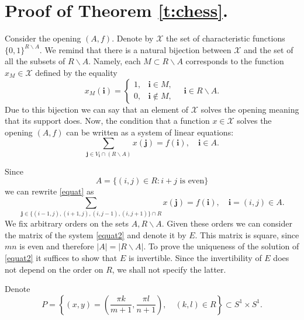 \documentclass[english,12pt]{article}
\theoremstyle{remark}
\theoremstyle{definition}
\theoremstyle{definition}
\newcommand{\bsi}{{\boldsymbol i}}
\newcommand{\bsj}{{\boldsymbol j}}
\begin{document}
\section{Proof of Theorem \ref{t:chess}.}


Consider the opening $(A,f)$. Denote by $\mathcal X$ the set of characteristic functions
$\{0,1\}^{R \backslash A}$. We remind that there is a natural bijection between $\mathcal X$ and
the set of all the subsets of $R\backslash A$. Namely, each $M\subset R\backslash A$ corresponds to
the function $x_M \in \mathcal X$ defined by the equality
\begin{equation}
x_M(\bsi)= \left \{
\begin{array}{cc}
1, & \bsi \in M, \\
0, & \bsi \not \in M,
\end{array}
\right . \quad \bsi \in R\backslash A.
\end{equation}
Due to this bijection we can say that an element of $\mathcal X$ solves the opening meaning that
its support does. Now, the condition that a function $x \in \mathcal X$ solves the opening $(A,f)$
can be written as a system of linear equations:
\begin{equation}\label{equat}
\sum_{\bsj \in V_{\bsi} \cap (R \backslash A)} x(\bsj) = f(\bsi),
\quad \bsi \in A.
\end{equation}

Since
\[ A=\{ (i,j) \in R : i+j \text{ is even}\} \]
we can rewrite \eqref{equat} as
\begin{equation}\label{equat2}
\sum_{\bsj \in \{(i-1,j),(i+1,j),(i,j-1),(i,j+1)\} \cap R} x(\bsj)
= f(\bsi), \quad \bsi =(i,j) \in A.
\end{equation}
We fix arbitrary orders on the sets $A,R\backslash A$. Given these orders we can consider the
matrix of the system \ref{equat2} and denote it by $E$. This matrix is square, since $mn$ is even
and therefore $| A|=|R \backslash A|$. To prove the uniqueness of the solution of \eqref{equat2} it
suffices to show that $E$ is invertible. Since the invertibility of $E$ does not depend on the
order on $R$, we shall not specify the latter.

Denote
\[ P=\left  \{(x,y)=\left (\frac{\pi k}{m+1},\frac{\pi l}{n+1} \right),
   \quad (k,l) \in R \right \} \subset S^1 \times S^1. \]
\end{document}
